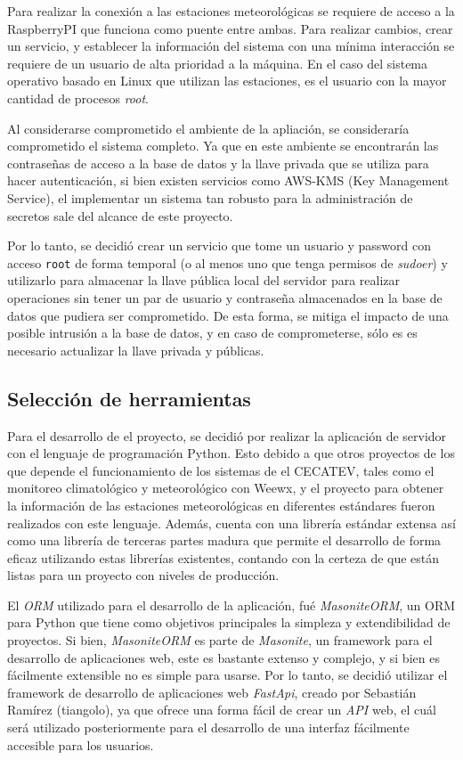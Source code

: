 Para realizar la conexión a las estaciones meteorológicas se requiere de acceso a la RaspberryPI que funciona como puente entre ambas. Para realizar cambios, crear un servicio, y establecer la información del sistema con una mínima interacción se requiere de un usuario de alta prioridad a la máquina. En el caso del sistema operativo basado en Linux que utilizan las estaciones, es el usuario con la mayor cantidad de procesos \emph{root}.

Al considerarse comprometido el ambiente de la apliación, se consideraría comprometido el sistema completo. Ya que en este ambiente se encontrarán las contraseñas de acceso a la base de datos y la llave privada que se utiliza para hacer autenticación, si bien existen servicios como AWS-KMS (Key Management Service), el implementar un sistema tan robusto para la administración de secretos sale del alcance de este proyecto.

Por lo tanto, se decidió crear un servicio que tome un usuario y password con acceso \texttt{root} de forma temporal (o al menos uno que tenga permisos de \emph{sudoer}) y utilizarlo para almacenar la llave pública local del servidor para realizar operaciones sin tener un par de usuario y contraseña almacenados en la base de datos que pudiera ser comprometido. De esta forma, se mitiga el impacto de una posible intrusión a la base de datos, y en caso de comprometerse, sólo es es necesario actualizar la llave privada y públicas.

\subsection{Selección de herramientas}

Para el desarrollo de el proyecto, se decidió por realizar la aplicación de servidor con el lenguaje de programación Python. Esto debido a que otros proyectos de los que depende el funcionamiento de los sistemas de el CECATEV, tales como el monitoreo climatológico y meteorológico con Weewx, y el proyecto para obtener la información de las estaciones meteorológicas en diferentes estándares \cite{jimenez2019management} fueron realizados con este lenguaje. Además, cuenta con una librería estándar extensa así como una librería de terceras partes madura que permite el desarrollo de forma eficaz utilizando estas librerías existentes, contando con la certeza de que están listas para un proyecto con niveles de producción.

El \textit{ORM} utilizado para el desarrollo de la aplicación, fué \textit{MasoniteORM}, un ORM para Python que tiene como objetivos principales la simpleza y extendibilidad de proyectos. Si bien, \textit{MasoniteORM} es parte de \textit{Masonite}, un framework para el desarrollo de aplicaciones web, este es bastante extenso y complejo, y si bien es fácilmente extensible no es simple para usarse. Por lo tanto, se decidió utilizar el framework de desarrollo de aplicaciones web \textit{FastApi}, creado por Sebastián Ramírez (tiangolo), ya que ofrece una forma fácil de crear un \textit{API} web, el cuál será utilizado posteriormente para el desarrollo de una interfaz fácilmente accesible para los usuarios.

